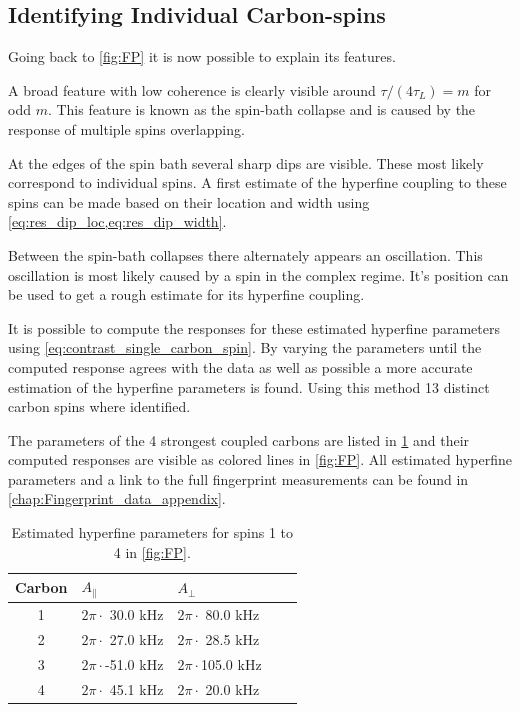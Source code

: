 \subsection{Identifying Individual Carbon-spins}
Going back to \cref{fig:FP} it is now possible to explain its features.

A broad feature with low coherence is clearly visible around $\tau/(4\tau_L) = m$ for odd $m$.
This feature is known as the spin-bath collapse and is caused by the response of multiple spins overlapping.

At the edges of the spin bath several sharp dips are visible. These most likely correspond to individual spins.
A first estimate of the hyperfine coupling to these spins can be made based on their location and width using \cref{eq:res_dip_loc,eq:res_dip_width}.

Between the spin-bath collapses there alternately appears an oscillation.
This oscillation is most likely caused by a spin in the complex regime.
It's position can be used to get a rough estimate for its hyperfine coupling.

It is possible to compute the responses for these estimated hyperfine parameters using \cref{eq:contrast_single_carbon_spin}.
By varying the parameters until the computed response agrees with the data as well as possible a more accurate estimation of the hyperfine parameters is found.
Using this method 13 distinct carbon spins where identified.

The parameters of the 4 strongest coupled carbons are listed in \cref{tbl:HF_par} and their computed responses are visible as colored lines in \cref{fig:FP}.
All estimated hyperfine parameters and a link to the full fingerprint measurements can be found in \cref{chap:Fingerprint_data_appendix}.

\begin{table}[htbp]
\centering
    \begin{tabular}{cllll}
    Carbon & \quad \quad  $A_{\parallel} $ & \quad \quad $A_{\perp}$ \\ \hline
    1         & $2 \pi \cdot${ }30.0 kHz             & $2 \pi \cdot${ }80.0 kHz                \\
    2         & $2 \pi \cdot${ }27.0 kHz             & $2 \pi \cdot${ }28.5 kHz              \\
    3         & $2 \pi \cdot$-51.0 kHz          & $2 \pi \cdot$105.0 kHz              \\
    4         & $2 \pi \cdot${ }45.1 kHz           & $2 \pi \cdot${ }20.0 kHz                \\
    \end{tabular}
    \caption{Estimated hyperfine parameters for spins 1 to 4 in \cref{fig:FP}.}
    \label{tbl:HF_par}
\end{table}

